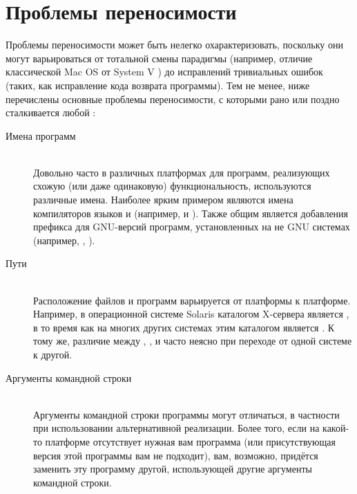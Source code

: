 \section{Проблемы переносимости}

Проблемы переносимости может быть нелегко охарактеризовать, поскольку
они могут варьироваться от тотальной смены парадигмы (например,
отличие классической Mac OS от System V \UNIX{}) до исправлений
тривиальных ошибок (таких, как исправление кода возврата программы).
Тем не менее, ниже перечислены основные проблемы переносимости, с
которыми рано или поздно сталкивается любой \Makefile{}:

\begin{description}
\item[Имена программ] \hfill \\
Довольно часто в различных платформах для программ, реализующих схожую
(или даже одинаковую) функциональность, используются различные имена.
Наиболее ярким примером являются имена компиляторов языков \Clang{} и 
\Cplusplus{} (например,  и ). Также общим
является добавления префикса  для GNU-версий программ,
установленных на не GNU системах (например, ,
). 

\item[Пути] \hfill \\
Расположение файлов и программ варьируется от платформы к платформе. 
Например, в операционной системе Solaris каталогом X-сервера
является , в то время как на многих других системах
этим каталогом является . К тому же, различие
между , ,  и
 часто неясно при переходе от одной системе к
другой.

\item[Аргументы командной строки] \hfill \\
Аргументы командной строки программы могут отличаться, в частности при
использовании альтернативной реализации. Более того, если на какой-то
платформе отсутствует нужная вам программа (или присутствующая версия
этой программы вам не подходит), вам, возможно, придётся заменить эту
программу другой, использующей другие аргументы командной строки.


\end{description}
